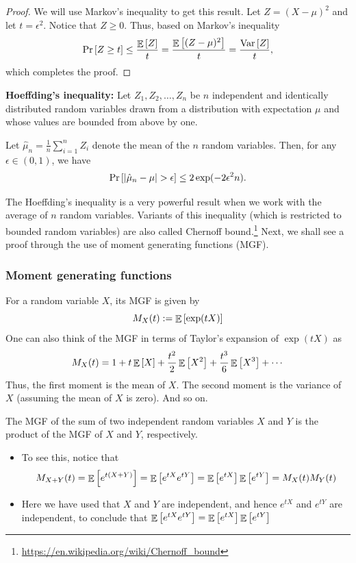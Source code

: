 \begin{proof}
We will use Markov's inequality to get this result.
Let $Z = (X - \mu)^2$ and let $t = \epsilon^2$.
Notice that $Z \ge 0$. Thus, based on Markov's inequality
\[ \Pr\left[Z \ge t \right] \le \frac {\mathop{\mathbb{E}}\left[ Z \right]} {t} = \frac {\mathop{\mathbb{E}}\left[ (Z - \mu)^2 \right]} t = \frac {\mathop{\textup{Var}}\left[ Z \right]} t,  \]
which completes the proof.
\end{proof}

\begin{mdframed}[
    roundcorner=10pt,
    leftmargin=0.1\textwidth,
    rightmargin=0.1\textwidth]
    \textbf{Hoeffding's inequality:}
    Let $Z_1, Z_2, \dots, Z_n$ be $n$ independent and identically distributed random variables drawn from a distribution with expectation $\mu$ and whose values are bounded from above by one.
    
    Let $\hat\mu_n = \frac 1 n \sum_{i=1}^n Z_i$ denote the mean of the $n$ random variables.
    Then, for any $\epsilon \in (0, 1)$, we have
    \begin{align} 
        \Pr\left[ {\left| {\hat\mu_n - \mu} \right|} > \epsilon \right] \le 2\exp(-2\epsilon^2 n). \label{eq_hoeff} 
    \end{align}
\end{mdframed}

The Hoeffding's inequality is a very powerful result when we work with the average of $n$ random variables.
Variants of this inequality (which is restricted to bounded random variables) are also called Chernoff bound.\footnote{\url{https://en.wikipedia.org/wiki/Chernoff_bound}}
Next, we shall see a proof through the use of moment generating functions (MGF).

\subsubsection{Moment generating functions}

\begin{definition}\label{def_mgf}
    For a random variable $X$, its MGF is given by
    \[ M_X(t) := \mathop{\mathbb{E}}\left[ \exp(t X) \right] \]
    One can also think of the MGF in terms of Taylor's expansion of $\exp(tX)$ as
    \[ M_X(t) = 1 + t \mathop{\mathbb{E}}\left[ X \right] + \frac{t^2}{2} \mathop{\mathbb{E}}\left[ X^2 \right] + \frac{t^3} 6 \mathop{\mathbb{E}}\left[ X^3 \right] + \cdots  \]
    Thus, the first moment is the mean of $X$.
    The second moment is the variance of $X$ (assuming the mean of $X$ is zero).
    And so on.
\end{definition}

The MGF of the sum of two independent random variables $X$ and $Y$ is the product of the MGF of $X$ and $Y$, respectively.
\begin{itemize}
    \item To see this, notice that
    \[ M_{X + Y}(t) = \mathop{\mathbb{E}}\left[ e^{t(X + Y)} \right] = \mathop{\mathbb{E}}\left[ e^{tX} e^{tY} \right] = \mathop{\mathbb{E}}\left[ e^{tX} \right] \mathop{\mathbb{E}}\left[ e^{tY} \right] = M_X(t) M_Y(t) \]

    \item Here we have used that $X$ and $Y$ are independent, and hence $e^{tX}$ and $e^{tY}$ are independent, to conclude that $\mathop{\mathbb{E}}\left[ e^{tX} e^{tY} \right] = \mathop{\mathbb{E}}\left[ e^{tX} \right] \mathop{\mathbb{E}}\left[ e^{tY} \right]$
\end{itemize}

